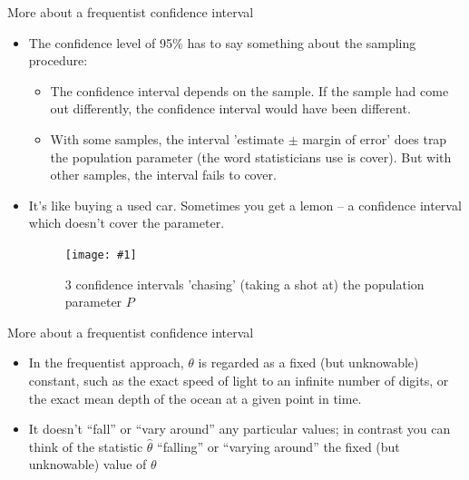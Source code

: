 \documentclass[handout]{beamer}\usepackage[]{graphicx}\usepackage[]{color}
\newcommand {\framedgraphiccaption}[2] {
	\begin{figure}
		\centering
		\texttt{[image: \#1]}
		\caption{#2}
	\end{figure}
}
\begin{document}


\begin{frame}{More about a frequentist confidence interval}

\begin{itemize}
	\item The confidence level of 95\% has to say something about the sampling procedure: \pause
		
	\begin{itemize}
		\item The confidence interval depends on the sample. If the sample had come out differently, the confidence interval would have been different. \pause
		\item With some samples, the interval 'estimate $\pm$ margin of error' does trap the population parameter (the word statisticians use is cover). But with other samples, the interval fails to cover.
	\end{itemize}
\pause
\item It's like buying a used car. Sometimes you get a lemon – a confidence interval which doesn't cover the parameter.

\framedgraphiccaption{lemon.jpg}{3 confidence intervals 'chasing' (taking a shot at) the population parameter $P$}
\end{itemize}
\end{frame}


\begin{frame}{More about a frequentist confidence interval}
\begin{itemize}
				\setlength\itemsep{2em}
	\item In the frequentist approach, $\theta$ is regarded as a fixed (but unknowable) constant, such as the exact speed of light to an infinite number of digits, or the exact mean depth of the ocean at a given point in time. \pause
	
	\item It doesn't ``fall'' or ``vary around'' any particular values; in contrast you can think of the statistic $\hat{\theta}$ ``falling'' or ``varying around'' the fixed (but unknowable) value of $\theta$
\end{itemize}
\end{frame}
\end{document}

